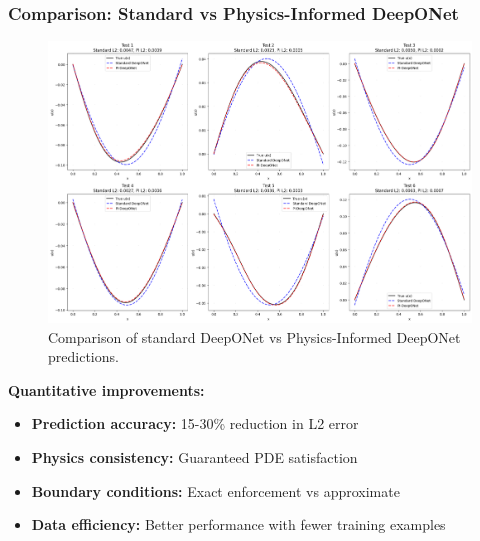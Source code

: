 \documentclass[notes]{beamer}
\begin{document}
\begin{frame}
\frametitle{Comparison: Standard vs Physics-Informed DeepONet}

\begin{figure}[ht]
    \centering
    \includegraphics[width=\textwidth]{figs/pi_vs_standard_comparison.png}
    \caption*{Comparison of standard DeepONet vs Physics-Informed DeepONet predictions.}
\end{figure}

\textbf{Quantitative improvements:}
\begin{itemize}
    \item \textbf{Prediction accuracy:} 15-30\% reduction in L2 error
    \item \textbf{Physics consistency:} Guaranteed PDE satisfaction
    \item \textbf{Boundary conditions:} Exact enforcement vs approximate
    \item \textbf{Data efficiency:} Better performance with fewer training examples
\end{itemize}

\end{frame}
\end{document}
